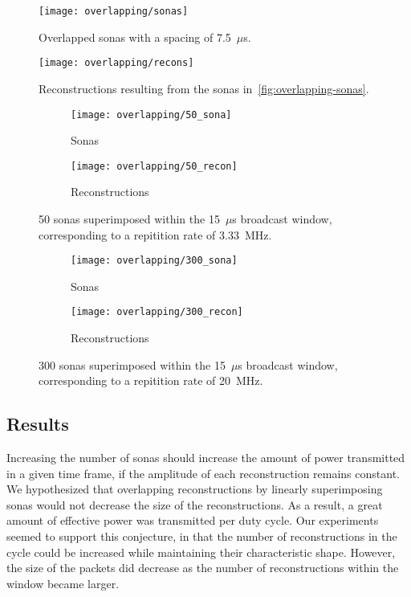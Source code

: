 \begin{figure}
\centering
\texttt{[image: overlapping/sonas]}
\caption[Overlapped sonas]{Overlapped sonas with a spacing of 7.5~$\mu$s.}
\label{fig:overlapping-sonas}

\vspace*{\floatsep}%

\texttt{[image: overlapping/recons]}
\caption[Overlapped reconstructions]{Reconstructions resulting from the sonas in~\ref{fig:overlapping-sonas}.}
\label{fig:overlapping-recons}
\end{figure}

\begin{figure}
\centering
\begin{subfigure}{.5\textwidth}
  \centering
  \texttt{[image: overlapping/50\_sona]}
  \caption{Sonas}
\end{subfigure}%
\begin{subfigure}{.5\textwidth}
  \centering
  \texttt{[image: overlapping/50\_recon]}
  \caption{Reconstructions}
\end{subfigure}
\caption[50 superimposed sonas]{50 sonas superimposed within the 15~$\mu$s broadcast window, corresponding to a repitition rate of 3.33~MHz.}
\label{fig:overlapping-50}

\vspace*{\floatsep}%

\begin{subfigure}{.5\textwidth}
  \centering
  \texttt{[image: overlapping/300\_sona]}
  \caption{Sonas}
\end{subfigure}%
\begin{subfigure}{.5\textwidth}
  \centering
  \texttt{[image: overlapping/300\_recon]}
  \caption{Reconstructions}
\end{subfigure}
\caption[300 superimposed sonas]{300 sonas superimposed within the 15~$\mu$s broadcast window, corresponding to a repitition rate of 20~MHz.}
\label{fig:overlapping-300}
\end{figure}

\subsection{Results}

Increasing the number of sonas should increase the amount of power transmitted in a given time frame, if the amplitude of each reconstruction remains constant. We hypothesized that overlapping reconstructions by linearly superimposing sonas would not decrease the size of the reconstructions. As a result, a great amount of effective power was transmitted per duty cycle. Our experiments seemed to support this conjecture, in that the number of reconstructions in the cycle could be increased while maintaining their characteristic shape. However, the size of the packets did decrease as the number of reconstructions within the window became larger.

